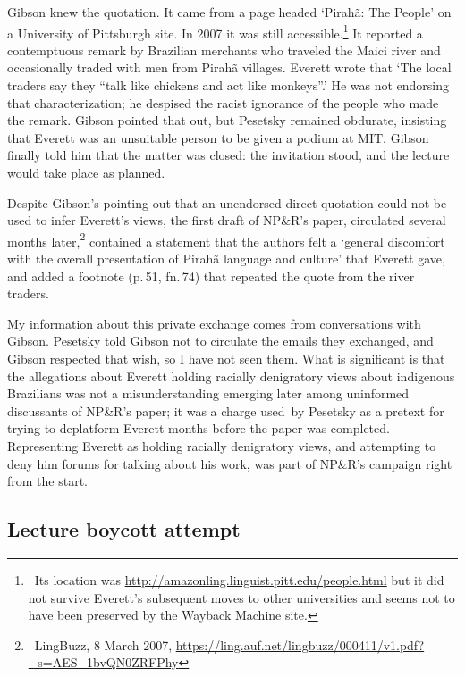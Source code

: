 \documentclass[output=paper,colorlinks,citecolor=brown
]{langscibook}
\begin{document}
Gibson knew the quotation. It came from a page headed `Pirah{\~a}:
The People' on a University of Pittsburgh site. In 2007 it was still
accessible.\footnote{\,
  Its location was \url{http://amazonling.linguist.pitt.edu/people.html}
  but it did not survive Everett's subsequent moves to other universities
  and seems not to have been preserved by the Wayback Machine site.}
It reported a contemptuous remark by Brazilian merchants who traveled
the Maici river and occasionally traded with men from Pirah{\~a} villages.
Everett wrote that `The local traders say they ``talk like chickens and
act like monkeys''.' He was not endorsing that characterization; he
despised the racist ignorance of the people who made the remark. Gibson
pointed that out, but Pesetsky remained obdurate, insisting that Everett
was an unsuitable person to be given a podium at MIT. Gibson finally
told him that the matter was closed: the invitation stood, and the
lecture would take place as planned.

Despite Gibson's pointing out that an unendorsed direct quotation could
not be used to infer Everett's views, the first draft of NP\&R's paper,
circulated several months later,\footnote{\,
   LingBuzz, 8 March 2007,
   \url{https://ling.auf.net/lingbuzz/000411/v1.pdf?_s=AES_1bvQN0ZRFPhy}}
contained a statement that the authors felt a `general discomfort with
the overall presentation of Pirahã language and culture' that Everett
gave, and added a footnote (p.\,51, fn.\,74) that repeated the quote
from the river traders.

My information about this private exchange comes from conversations with
Gibson. Pesetsky told Gibson not to circulate the emails they exchanged,
and Gibson respected that wish, so I have not seen them. What is
significant is that the allegations about Everett holding racially
denigratory views about indigenous Brazilians was not a misunderstanding
emerging later among uninformed discussants of NP\&R's paper; it was a
charge used by Pesetsky as a pretext for trying to deplatform Everett
months before the paper was completed. Representing Everett as holding
racially denigratory views, and attempting to deny him forums for talking
about his work, was part of NP\&R’s campaign right from the start.

\subsection{Lecture boycott attempt}
\end{document}
